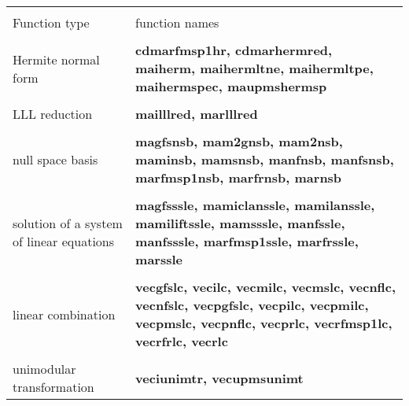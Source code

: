 \begin{center}
\begin{tabular}{|p{1.1in}|p{4.0in}|}
\hline &\\[-1.3ex]
Function type  &
function names\\[1.5ex]
\hline &\\[-1.3ex]

Hermite \newline
normal form & 
{\bf cdmarfmsp1hr, cdmarhermred, maiherm, \newline
maihermltne, maihermltpe, \newline
maihermspec, maupmshermsp} \\[1.5ex]
\hline &\\[-1.3ex]

LLL reduction & 
{\bf mailllred, marlllred} \\[1.5ex]
\hline &\\[-1.3ex]

null space basis & 
{\bf magfsnsb, mam2gnsb, mam2nsb, maminsb, \newline
mamsnsb, manfnsb, manfsnsb, marfmsp1nsb, \newline
marfrnsb, marnsb} \\[1.5ex]
\hline &\\[-1.3ex]

solution of a \newline
system of \newline
linear equations & 
{\bf magfsssle, mamiclanssle, mamilanssle, mamiliftssle, mamsssle, manfssle,
manfsssle, marfmsp1ssle, \newline
marfrssle, marssle} \\[1.5ex]
\hline &\\[-1.3ex]

linear \newline
combination & 
{\bf vecgfslc, vecilc, vecmilc, vecmslc, vecnflc, \newline
vecnfslc, vecpgfslc, vecpilc, vecpmilc, vecpmslc, \newline
vecpnflc, vecprlc, vecrfmsp1lc, vecrfrlc, vecrlc } \\[1.5ex]
\hline &\\[-1.3ex]

unimodular \newline
transformation & 
{\bf veciunimtr, vecupmsunimt} \\[4.8ex]
\hline
\end{tabular}
\end{center}

\leer

